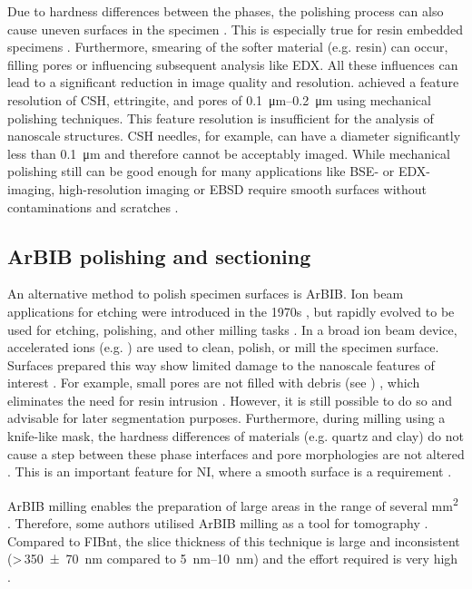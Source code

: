 Due to hardness differences between the phases, the polishing process can also cause uneven surfaces in the specimen \cite{ji.2014}.
This is especially true for resin embedded specimens \cite{desbois.2010}.
Furthermore, smearing of the softer material (e.g. resin) can occur, filling pores or influencing subsequent analysis like \ac{EDX}.
All these influences can lead to a significant reduction in image quality and resolution.
\textcite{scrivener.2004} achieved a feature resolution of \ac{CSH}, ettringite, and pores of \qtyrange{0.1}{0.2}{\micro\meter} using mechanical polishing techniques.
This feature resolution is insufficient for the analysis of nanoscale structures.
\ac{CSH} needles, for example, can have a diameter significantly less than \qty{0.1}{\micro\meter} \cite{moser.2003} and therefore cannot be acceptably imaged.
While mechanical polishing still can be good enough for many applications like \ac{BSE}- or \ac{EDX}-imaging, high-resolution imaging or \ac{EBSD} require smooth surfaces without contaminations and scratches \cite{rossler.2017}.


\subsection{\Acl*{ArBIB} polishing and sectioning}

An alternative method to polish specimen surfaces is \ac{ArBIB}.
Ion beam applications for etching were introduced in the 1970s \cite{lee.1979}, but rapidly evolved to be used for etching, polishing, and other milling tasks \cite{harper.1983,grunewald.1987}.
In a broad ion beam device, accelerated ions (e.g. ) are used to clean, polish, or mill the specimen surface.
Surfaces prepared this way show limited damage to the nanoscale features of interest \cite{desbois.2009,desbois.2010, houben.2014}.
For example, small pores are not filled with debris (see ) \cite{desbois.2009,desbois.2010}, which eliminates the need for resin intrusion \cite{desbois.2009}.
However, it is still possible to do so \cite{rossler.2017} and advisable for later segmentation purposes.
Furthermore, during milling using a knife-like mask, the hardness differences of materials (e.g. quartz and clay) do not cause a step between these phase interfaces and pore morphologies are not altered \cite{houben.2014}.
This is an important feature for \ac{NI}, where a smooth surface is a requirement \cite{wilson.2018}.

\Ac{ArBIB} milling enables the preparation of large areas in the range of several \unit{\milli\meter\squared} \cite{hauffe.2003,desbois.2013}.
Therefore, some authors utilised \ac{ArBIB} milling as a tool for tomography \cite{desbois.2013,mac.2018}.
Compared to \ac{FIBnt}, the slice thickness of this technique is large and inconsistent (>\,\qty{350(70)}{\nano\meter} compared to \qtyrange{5}{10}{\nano\meter}) and the effort required is very high \cite{desbois.2013}.


